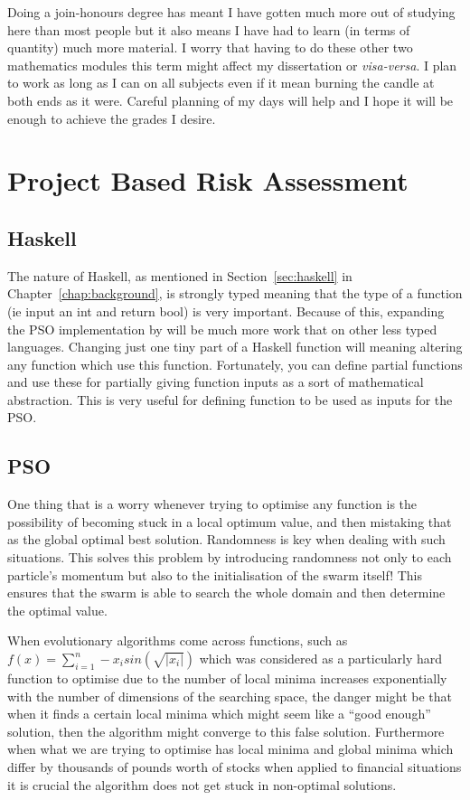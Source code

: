 \documentclass{pdfmx4020}
\begin{document}
    Doing a join-honours degree has meant I have gotten much more out of studying here than most people but it also means I have had to learn (in terms of quantity) much more material. I worry that having to do these other two mathematics modules this term might affect my dissertation or \textit{visa-versa}. I plan to work as long as I can on all subjects even if it mean burning the candle at both ends as it were. Careful planning of my days will help and I hope it will be enough to achieve the grades I desire. 
  \section{Project Based Risk Assessment} %
  \label{sec:project_based}
    \subsection{Haskell} %
    \label{sub:haskell}
      The nature of Haskell, as mentioned in Section~\ref{sec:haskell} in Chapter~\ref{chap:background}, is strongly typed meaning that the type of a function (ie input an int and return bool) is very important. Because of this, expanding the PSO implementation by \cite{haskellPSO} will be much more work that on other less typed languages. Changing just one tiny part of a Haskell function will meaning altering any function which use this function. Fortunately, you can define partial functions and use these for partially giving function inputs as a sort of mathematical abstraction. This is very useful for defining function to be used as inputs for the PSO. 
    \subsection{PSO} %
    \label{sub:pso}
      One thing that is a worry whenever trying to optimise any function is the possibility of becoming stuck in a local optimum value, and then mistaking that as the global optimal best solution. Randomness is key when dealing with such situations. This solves this problem by introducing randomness not only to each particle's momentum but also to the initialisation of the swarm itself! This ensures that the swarm is able to search the whole domain and then determine the optimal value. 

      When evolutionary algorithms come across functions, such as $f(x)=\sum\limits_{i=1}^n -x_i sin(\sqrt{|x_i|})$ which was considered \cite{localmin} as a particularly hard function to optimise due to the number of local minima increases exponentially with the number of dimensions of the searching space, the danger might be that when it finds a certain local minima which might seem like a ``good enough'' solution, then the algorithm might converge to this false solution. Furthermore when what we are trying to optimise has local minima and global minima which differ by thousands of pounds worth of stocks when applied to financial situations it is crucial the algorithm does not get stuck in non-optimal solutions. 
\end{document}
